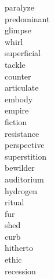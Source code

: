 \documentclass[b5paper, 11pt]{ctexart}
\begin{document}
\begin{multicols*}{3}
\begin{description}
\item[paralyze]

\item[predominant]

\item[glimpse]

\item[whirl]

\item[superficial]

\item[tackle]

\item[counter]

\item[articulate]

\item[embody]

\item[empire]

\item[fiction]

\item[resistance]

\item[perspective]

\item[superstition]

\item[bewilder]

\item[auditorium]

\item[hydrogen]

\item[ritual]

\item[fur]

\item[shed]

\item[curb]

\item[hitherto]

\item[ethic]

\item[recession]

    \end{description}
\end{multicols*}
\end{document}
